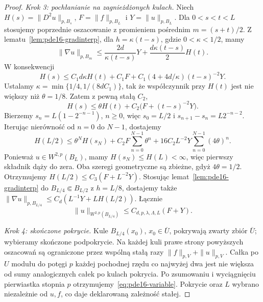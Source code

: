 \begin{proof}
\emph{Krok 3: pochłanianie na zagnieżdżonych kulach.}
Niech $H(s)=\|D^2u\|_{p,B_s}$,
$F=\|f\|_{p,B_L}$ i $Y=\|u\|_{p,B_L}$.
Dla $0<s<t<L$ stosujemy poprzednie oszacowanie
z promieniem pośrednim $m=(s+t)/2$.
Z lematu~\ref{lem:pde16-gradinterp}, dla
$h=\kappa(t-s)$, gdzie $0<\kappa<1/2$, mamy
\[
 \|\nabla u\|_{p,B_m}
 \le \frac{2d}{\kappa(t-s)}Y
       +\frac{d\kappa(t-s)}2 H(t).
\]
W konsekwencji
\[
 H(s)\le C_1 d\kappa H(t)+C_1 F
       +C_1(4+4d/\kappa)(t-s)^{-2}Y .
\]
Ustalamy $\kappa=\min\{1/4,1/(8dC_1)\}$,
tak że współczynnik przy $H(t)$ jest nie większy
niż $\theta=1/8$. Zatem z pewną stałą $C_2$,
\[
 H(s)\le\theta H(t)+C_2\bigl(F+(t-s)^{-2}Y\bigr).
\]
Bierzemy $s_n=L(1-2^{-n-1})$, $n\ge0$,
więc $s_0=L/2$ i $s_{n+1}-s_n=L2^{-n-2}$.
Iterując nierówność od $n=0$ do $N-1$, dostajemy
\[
 H(L/2)\le\theta^N H(s_N)
 +C_2 F\sum_{n=0}^{N-1}\theta^n
 +16C_2 L^{-2}Y\sum_{n=0}^{N-1}(4\theta)^n.
\]
Ponieważ $u\in W^{2,p}(B_L)$, mamy $H(s_N)\le H(L)<\infty$,
więc pierwszy składnik dąży do zera.
Oba szeregi geometryczne są zbieżne, gdyż $4\theta=1/2$.
Otrzymujemy
$H(L/2)\le C_3(F+L^{-2}Y)$.
Stosując lemat~\ref{lem:pde16-gradinterp}
do $B_{L/4}\Subset B_{L/2}$ z $h=L/8$, dostajemy
także $\|\nabla u\|_{p,B_{L/4}}\le
C_d(L^{-1}Y+L H(L/2))$.
Łącznie
\[
 \|u\|_{W^{2,p}(B_{L/4})}
 \le C_{d,p,\lambda,\Lambda,L}(F+Y).
\]

\emph{Krok 4: skończone pokrycie.}
Kule $B_{L/4}(x_0)$, $x_0\in\overline U$,
pokrywają zwarty zbiór $\overline U$; wybieramy
skończone podpokrycie. Na każdej kuli prawe strony
powyższych oszacowań są ograniczone przez wspólną
stałą razy $\|f\|_{p,V}+\|u\|_{p,V}$.
Całka po $U$ modułu do potęgi $p$ każdej pochodnej
rzędu co najwyżej dwa jest nie większa od sumy
analogicznych całek po kulach pokrycia.
Po zsumowaniu i wyciągnięciu pierwiastka stopnia $p$
otrzymujemy~\eqref{eq:pde16-variable}.
Pokrycie oraz $L$ wybrano niezależnie od $u,f$,
co daje deklarowaną zależność stałej.
\end{proof}

